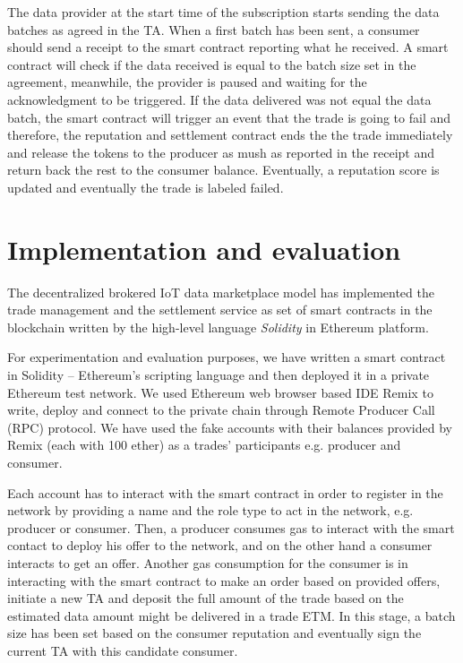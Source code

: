 \documentclass[letterpaper, 10 pt, conference]{ieeeconf}  %
\begin{document}
The data provider at the start time of the subscription starts sending the data batches as agreed in the TA. When a first batch has been sent, a consumer should send a receipt to the smart contract reporting what he received. A smart contract will check if the data received is equal to the batch size set in the agreement, meanwhile, the provider is paused and waiting for the acknowledgment to be triggered. If the data delivered was not equal the data batch, the smart contract will trigger an event that the trade is going to fail and therefore, the reputation and settlement contract ends the the trade immediately and release the tokens to the producer as mush as reported in the receipt and return back the rest to the consumer balance. Eventually, a reputation score is updated and eventually the trade is labeled failed. 

\section{Implementation and evaluation} \label{sec:evaluation}

The decentralized brokered IoT data marketplace model has implemented the trade management and the settlement service as set of smart contracts in the blockchain written by the high-level language \textit{Solidity} in Ethereum platform. 

For experimentation and evaluation purposes, we have written a smart contract in Solidity – Ethereum’s scripting language and then deployed it in a private Ethereum test network. We used Ethereum web browser based IDE Remix \cite{25} to write, deploy and connect to the private chain through Remote Producer Call (RPC) protocol. We have used the fake accounts with their balances provided by Remix (each with 100 ether) as a trades’ participants e.g. producer and consumer. 

Each account has to interact with the smart contract in order to register in the network by providing a name and the role type to act in the network, e.g. producer or consumer. Then, a producer consumes gas to interact with the smart contact to deploy his offer to the network, and on the other hand a consumer interacts to get an offer. Another gas consumption for the consumer is in interacting with the smart contract to make an order based on provided offers, initiate a new TA and deposit the full amount of the trade based on the estimated data amount might be delivered in a trade ETM. In this stage, a batch size has been set based on the consumer reputation and eventually sign the current TA with this candidate consumer. 
\end{document}
